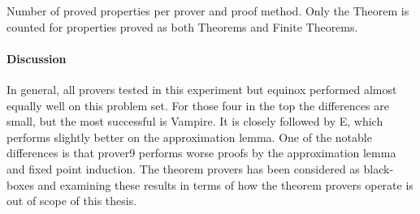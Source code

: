 \begin{table}[h]
\centering

\caption{Number of proved properties per prover and proof method.
         Only the Theorem is counted for properties proved as both
         Theorems and Finite Theorems.
\label{tbl:proved}
}
\end{table}

\paragraph{Discussion}
In general, all provers tested in this experiment but equinox
performed almost equally well on this problem set. For those four in
the top the differences are small, but the most successful is
Vampire. It is closely followed by E, which performs slightly better on
the approximation lemma. One of the notable differences is that
prover9 performs worse proofs by the approximation lemma and fixed
point induction. The theorem provers has been considered as
black-boxes and examining these results in terms of how the theorem
provers operate is out of scope of this thesis.

